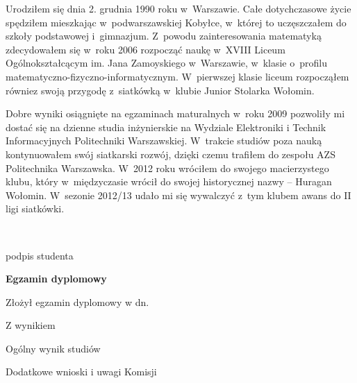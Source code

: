 \begin{titlepage}
\begin{center}
    \end{center}
\small
    \indent
    Urodziłem się dnia 2. grudnia 1990 roku w~Warszawie. Całe dotychczasowe życie spędziłem mieszkając w~podwarszawskiej Kobyłce, w~której to uczęszczałem do szkoły podstawowej i~gimnazjum. Z~powodu zainteresowania matematyką zdecydowałem się w~roku 2006 rozpocząć naukę w~XVIII Liceum Ogólnokształcącym im. Jana Zamoyskiego w~Warszawie, w~klasie o~profilu matematyczno-fizyczno-informatycznym. W~pierwszej klasie liceum rozpocząłem równiez swoją przygodę z~siatkówką w~klubie Junior Stolarka Wołomin.
    \par
Dobre wyniki osiągnięte na egzaminach maturalnych w~roku 2009 pozwoliły mi dostać się na dzienne studia inżynierskie na Wydziale Elektroniki i Technik Informacyjnych Politechniki Warszawskiej.
W~trakcie studiów poza nauką kontynuowałem swój siatkarski rozwój, dzięki czemu trafiłem do zespołu AZS Politechnika Warszawska. W~2012 roku wróciłem do swojego macierzystego klubu, który w~międzyczasie wrócił do swojej historycznej nazwy -- Huragan Wołomin. W~sezonie 2012/13 udało mi się wywalczyć z~tym klubem awans do II ligi siatkówki.

\normalsize
    \par
    \vspace{2\baselineskip}
    \hfill\parbox{15em}{{\small\dotfill}\\[-.3ex]
    \centerline{\footnotesize podpis studenta}}\par
    \vspace{2\baselineskip}
    \begin{center}
 	{\large\bfseries Egzamin dyplomowy} \par\bigskip\bigskip
    \end{center}
    \par\noindent\vspace{1.5\baselineskip}
    Złożył egzamin dyplomowy w dn. \dotfill
    \par\noindent\vspace{1.5\baselineskip}
    Z wynikiem \dotfill
    \par\noindent\vspace{1.5\baselineskip}
    Ogólny wynik studiów \dotfill
    \par\noindent\vspace{1.5\baselineskip}
    Dodatkowe wnioski i uwagi Komisji \dotfill
    \par\noindent\vspace{1.5\baselineskip}
    \dotfill


\end{titlepage}
